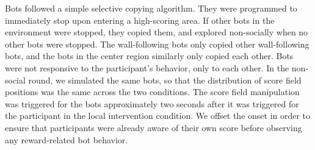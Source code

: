 \documentclass[12pt,letterpaper]{article}
\begin{document}
Bots followed a simple selective copying algorithm. 
They were programmed to immediately stop upon entering a high-scoring area.
If other bots in the environment were stopped, they copied them, and explored non-socially when no other bots were stopped.
The wall-following bots only copied other wall-following bots, and the bots in the center region similarly only copied each other.
Bots were not responsive to the participant's behavior, only to each other.
In the non-social round, we simulated the same bots, so that the distribution of score field positions was the same across the two conditions. 
The score field manipulation was triggered for the bots approximately two seconds after it was triggered for the participant in the local intervention condition. 
We offset the onset in order to ensure that participants were already aware of their own score before observing any reward-related bot behavior.





\end{document}
